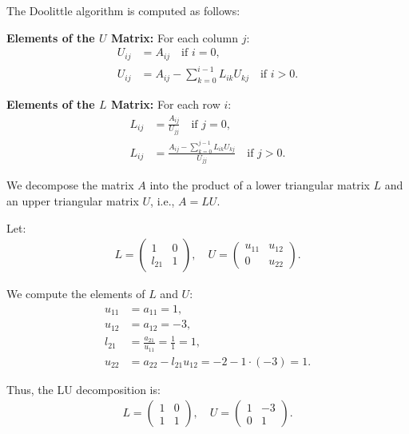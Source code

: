 \documentclass[journal,12pt,onecolumn]{IEEEtran}
\theoremstyle{remark}
\begin{document}
The Doolittle algorithm is computed as follows:

\textbf{Elements of the $U$ Matrix:}  
For each column $j$:
\begin{align}
    U_{ij} &= A_{ij} \quad \text{if } i = 0,\\
    U_{ij} &= A_{ij} - \sum_{k=0}^{i-1} L_{ik} U_{kj} \quad \text{if } i > 0.
\end{align}

\textbf{Elements of the $L$ Matrix:}  
For each row $i$:  
\begin{align}
    L_{ij} &= \frac{A_{ij}}{U_{jj}} \quad \text{if } j = 0, \\  
    L_{ij} &= \frac{A_{ij} - \sum_{k=0}^{j-1} L_{ik} U_{kj}}{U_{jj}} \quad \text{if } j > 0.  
\end{align}

We decompose the matrix $A$ into the product of a lower triangular matrix $L$ and an upper triangular matrix $U$, i.e., $A = LU$.

Let:
\begin{align}
    L =
    \begin{pmatrix}
        1 & 0 \\
        l_{21} & 1
    \end{pmatrix},
    \quad
    U =
    \begin{pmatrix}
        u_{11} & u_{12} \\
        0 & u_{22}
    \end{pmatrix}.
\end{align}

We compute the elements of $L$ and $U$:
\begin{align}
    u_{11} &= a_{11} = 1, \\
    u_{12} &= a_{12} = -3, \\
    l_{21} &= \frac{a_{21}}{u_{11}} = \frac{1}{1} = 1, \\
    u_{22} &= a_{22} - l_{21} u_{12} = -2 - 1 \cdot (-3) = 1.
\end{align}

Thus, the LU decomposition is:
\begin{align}
    L =
    \begin{pmatrix}
        1 & 0 \\
        1 & 1
    \end{pmatrix},
    \quad
    U =
    \begin{pmatrix}
        1 & -3 \\
        0 & 1
    \end{pmatrix}.
\end{align}
\end{document}
